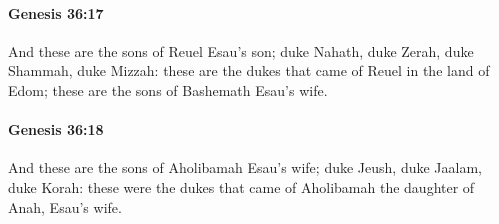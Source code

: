 		\paragraph{Genesis 36:17} %
			\label{GENESIS-36-17}

			And these are the sons of Reuel Esau's son; duke Nahath, duke Zerah, duke Shammah, duke Mizzah: these are the dukes that came of Reuel in the land of Edom; these are the sons of Bashemath Esau's wife.


		\paragraph{Genesis 36:18} %
			\label{GENESIS-36-18}

			And these are the sons of Aholibamah Esau's wife; duke Jeush, duke Jaalam, duke Korah: these were the dukes that came of Aholibamah the daughter of Anah, Esau's wife.


